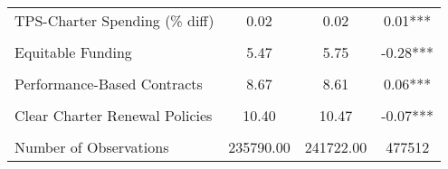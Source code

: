 \begin{table}[!h]
\begin{tabular}[t]{lccc}
TPS-Charter Spending (\% diff) & 0.02 & 0.02 & 0.01***\\
\cellcolor{gray!10}{Total Spending (per-pupil)} & \cellcolor{gray!10}{12971.90} & \cellcolor{gray!10}{13461.80} & \cellcolor{gray!10}{-489.9***}\\
Equitable Funding & 5.47 & 5.75 & -0.28***\\
\cellcolor{gray!10}{No Caps on CS Growth} & \cellcolor{gray!10}{8.83} & \cellcolor{gray!10}{8.82} & \cellcolor{gray!10}{0.01}\\
Performance-Based Contracts & 8.67 & 8.61 & 0.06***\\
\cellcolor{gray!10}{Transparent Charter Startup Policies} & \cellcolor{gray!10}{8.32} & \cellcolor{gray!10}{8.50} & \cellcolor{gray!10}{-0.18***}\\
Clear Charter Renewal Policies & 10.40 & 10.47 & -0.07***\\
\cellcolor{gray!10}{Exempt from State/District Regs} & \cellcolor{gray!10}{7.26} & \cellcolor{gray!10}{7.21} & \cellcolor{gray!10}{0.05***}\\
\midrule
Number of Observations & 235790.00 & 241722.00 & 477512\\
\bottomrule
\end{tabular}
\end{table}
